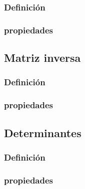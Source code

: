 \documentclass{article}
\begin{document}
\subsubsection{Definición}
\subsubsection{propiedades}

\subsection{Matriz inversa}
\subsubsection{Definición}
\subsubsection{propiedades}

\subsection{Determinantes}
\subsubsection{Definición}
\subsubsection{propiedades}

\end{document}
